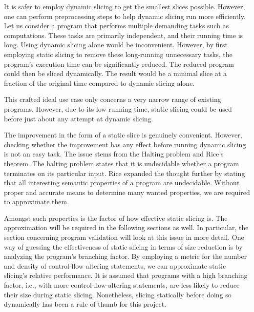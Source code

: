 It is safer to employ dynamic slicing to get the smallest slices possible.
However, one can perform preprocessing steps to help dynamic slicing run more 
efficiently.
Let us consider a program that performs multiple demanding tasks 
such as computations.
These tasks are primarily independent, and their running time is long.
Using dynamic slicing alone would be inconvenient.
However, by first employing static slicing to remove these long-running 
unnecessary tasks, the program's execution time can be significantly reduced.
The reduced program could then be sliced dynamically.
The result would be a minimal slice at a fraction of the original time 
compared to dynamic slicing alone.

This crafted ideal use case only concerns a very narrow range of existing 
programs.
However, due to its low running time, static slicing could be used before 
just about any attempt at dynamic slicing.


The improvement in the form of a static slice is genuinely convenient.
However, checking whether the improvement has any effect before running 
dynamic slicing is not an easy task.
The issue stems from the Halting problem and Rice's theorem.
The halting problem states that it is undecidable whether a program 
terminates on its particular input.
Rice expanded the thought further by stating that all interesting semantic 
properties of a program are undecidable.
Without proper and accurate means to determine many wanted properties, 
we are required to approximate them.

Amongst such properties is the factor of how effective static slicing is.
The approximation will be required in the following sections as well.
In particular, the section concerning program validation will look at this 
issue in more detail.
One way of guessing the effectiveness of static slicing in terms of size 
reduction is by analyzing the program's branching factor.
By employing a metric for the number and density of control-flow altering 
statements, we can approximate static slicing's relative performance.
It is assumed that programs with a high branching factor, i.e., with more 
control-flow-altering statements, are less likely to reduce their size 
during static slicing.
Nonetheless, slicing statically before doing so dynamically has been 
a rule of thumb for this project.

